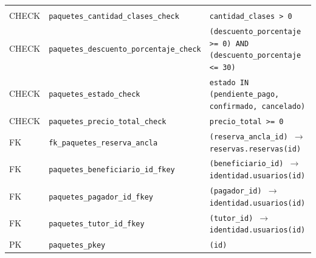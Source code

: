 {\small
\begin{xltabular}{\textwidth}{@{}>{\raggedright\arraybackslash}p{1.7cm} >{\raggedright\arraybackslash}p{4.6cm} L@{}}
    \toprule
     &  &  \\
    \midrule
    \endfirsthead
    \toprule
     &  &  \\
    \midrule
    \endhead
    \bottomrule
    \endfoot
    CHECK & \texttt{paquetes\_\allowbreak{}cantidad\_\allowbreak{}clases\_\allowbreak{}check} & \texttt{cantidad\_\allowbreak{}clases \textgreater{} 0} \\
    CHECK & \texttt{paquetes\_\allowbreak{}descuento\_\allowbreak{}porcentaje\_\allowbreak{}check} & \texttt{(\allowbreak{}descuento\_\allowbreak{}porcentaje \textgreater{}= 0) AND (\allowbreak{}descuento\_\allowbreak{}porcentaje \textless{}= 30)} \\
    CHECK & \texttt{paquetes\_\allowbreak{}estado\_\allowbreak{}check} & \texttt{estado IN (\allowbreak{}\textquotesingle{}pendiente\_\allowbreak{}pago\textquotesingle{},\allowbreak{} \textquotesingle{}confirmado\textquotesingle{},\allowbreak{} \textquotesingle{}cancelado\textquotesingle{})} \\
    CHECK & \texttt{paquetes\_\allowbreak{}precio\_\allowbreak{}total\_\allowbreak{}check} & \texttt{precio\_\allowbreak{}total \textgreater{}= 0} \\
    FK & \texttt{fk\_\allowbreak{}paquetes\_\allowbreak{}reserva\_\allowbreak{}ancla} & \texttt{(\allowbreak{}reserva\_\allowbreak{}ancla\_\allowbreak{}id) $\rightarrow$ reservas.reservas(\allowbreak{}id)} \\
    FK & \texttt{paquetes\_\allowbreak{}beneficiario\_\allowbreak{}id\_\allowbreak{}fkey} & \texttt{(\allowbreak{}beneficiario\_\allowbreak{}id) $\rightarrow$ identidad.usuarios(\allowbreak{}id)} \\
    FK & \texttt{paquetes\_\allowbreak{}pagador\_\allowbreak{}id\_\allowbreak{}fkey} & \texttt{(\allowbreak{}pagador\_\allowbreak{}id) $\rightarrow$ identidad.usuarios(\allowbreak{}id)} \\
    FK & \texttt{paquetes\_\allowbreak{}tutor\_\allowbreak{}id\_\allowbreak{}fkey} & \texttt{(\allowbreak{}tutor\_\allowbreak{}id) $\rightarrow$ identidad.usuarios(\allowbreak{}id)} \\
    PK & \texttt{paquetes\_\allowbreak{}pkey} & \texttt{(\allowbreak{}id)} \\
\end{xltabular}
}

